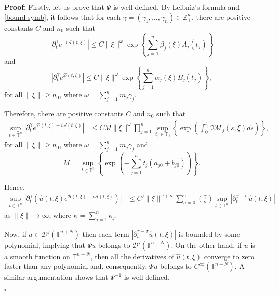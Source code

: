 \documentclass[12pt]{elsarticle}
\numberwithin{equation}{section}
\newenvironment{proof}[1][\noindent \textbf{Proof: }]{#1}{ \hfill $\square$ \vspace{2mm}}
\begin{document}
\begin{proof}
Firstly, let us prove that $\Psi$  is well defined.	By Leibniz's formula and \eqref{bound-symb}, it follows that for each $\gamma = (\gamma_1, \ldots, \gamma_n) \in \mathbb{Z}^{n}_+$, there are  positive constants $C$ and $n_0$ such that
\begin{equation}\label{exp_A}
|\partial_t^\gamma e^{- i \mathcal{A}(t,\xi)}| \leq C \|\xi\|^{\omega}  
\exp \left\{\sum_{j=1}^{n}\beta_j(\xi)A_j(t_j) \right\}
\end{equation}
and
\begin{equation}\label{exp_B}
|\partial_t^\gamma e^{\mathcal{B}(t,\xi)}| 
\leq C \|\xi\|^{\omega}  
\exp \left\{\sum_{j=1}^{n}\alpha_j(\xi)B_j(t_j) \right\},
\end{equation}
for all $\|\xi\|\geq n_0$, where $\omega = \sum_{j=1}^{n}m_j \gamma_j.$

Therefore, there are  positive constants $C$ and $n_0$ such that
\begin{align*}
\sup_{t \in \mathbb{T}^n}|\partial_t^\gamma e^{\mathcal{B}(t,\xi) -i \mathcal{A}(t,\xi) }| 
& \leq C M \|\xi\|^{\omega}  \prod_{j=1}^{n} \sup_{t_j \in \mathbb{T}_j}\left\{ 
\exp \left(\int_{0}^{t_j} \Im \mathcal{M}_{j}(s,\xi) ds\right) \right\},
\end{align*}
for all $\|\xi\|\geq n_0$, where $\omega = \sum_{j=1}^{n}m_j \gamma_j$ 
and 
$$
M = \sup_{t \in \mathbb{T}^n}\left\{ \exp \left(-\sum_{j=1}^{n}  t_j( a_{j0} + b_{j0})\right) \right\}.
$$ 

Hence, 
\begin{align*}
\sup_{t \in \mathbb{T}^n}|\partial_t^\gamma \left( \widehat{u}(t, \xi) e^{\mathcal{B}(t,\xi) -i \mathcal{A}(t,\xi) }\right)| 
& \leq C' \|\xi\|^{\omega+\kappa} 
 \sum_{\sigma = 0}^{\gamma}\binom{\gamma}{\sigma} \sup_{t \in \mathbb{T}^n}  |\partial_t^{\gamma - \sigma} \widehat{u}(t, \xi)|
\end{align*}
as $\|\xi\| \rightarrow \infty$, where $\kappa = \sum_{j=1}^{n}\kappa_j$.

Now, if $u \in \mathcal{D}'(\mathbb{T}^{n+N})$ then each term $|\partial_t^{\gamma - \sigma} \widehat{u}(t, \xi)|$ is bounded by some polynomial, implying that $\Psi u$ belongs to $\mathcal{D}'(\mathbb{T}^{n+N})$. On the other hand, if $u$ is a smooth function on  $\mathbb{T}^{n+N}$, then all the derivatives of $\widehat{u}(t, \xi)$ converge to zero faster than any polynomial and, consequently, $\Psi u$ belongs to $C^{\infty}(\mathbb{T}^{n+N})$.  A similar argumentation shows that $\Psi^{-1}$ is well defined.


\end{proof}
\end{document}
